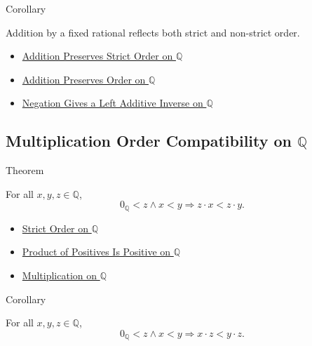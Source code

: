 \begin{corollarybox}{Corollary}
\begin{corollary}
\label{cor:addition-reflects-order-on-q}
Addition by a fixed rational reflects both strict and non-strict order.
\end{corollary}
\end{corollarybox}

\begin{dependencies}
\begin{itemize}
  \item \hyperref[thm:addition-preserves-strict-order-on-q]{Addition Preserves Strict Order on $\mathbb{Q}$}
  \item \hyperref[thm:addition-preserves-order-on-q]{Addition Preserves Order on $\mathbb{Q}$}
  \item \hyperref[thm:negation-left-additive-inverse-on-q]{Negation Gives a Left Additive Inverse on $\mathbb{Q}$}
\end{itemize}
\end{dependencies}

\subsection*{Multiplication Order Compatibility on $\mathbb{Q}$}

\begin{theorembox}{Theorem}
\begin{theorem}
\label{thm:left-positive-multiplication-preserves-strict-order-on-q}
For all $x,y,z\in\mathbb{Q}$,
\[
0_{\mathbb{Q}}<z\land x<y
\Longrightarrow
z\cdot x<z\cdot y.
\]
\end{theorem}
\end{theorembox}

\begin{dependencies}
\begin{itemize}
  \item \hyperref[def:strict-order-on-q]{Strict Order on $\mathbb{Q}$}
  \item \hyperref[prop:product-of-positives-is-positive-q]{Product of Positives Is Positive on $\mathbb{Q}$}
  \item \hyperref[def:multiplication-on-q-classes]{Multiplication on $\mathbb{Q}$}
\end{itemize}
\end{dependencies}

\begin{corollarybox}{Corollary}
\begin{corollary}
\label{cor:right-positive-multiplication-preserves-strict-order-on-q}
For all $x,y,z\in\mathbb{Q}$,
\[
0_{\mathbb{Q}}<z\land x<y
\Longrightarrow
x\cdot z<y\cdot z.
\]
\end{corollary}
\end{corollarybox}

